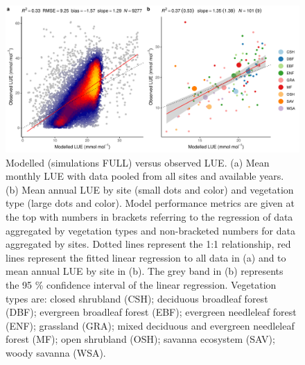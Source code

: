 \documentclass{myreport}
\begin{document}
 \begin{figure}[!ht]
\includegraphics[width=\textwidth]{fig/modobs_lue.pdf}
    \caption{Modelled (simulations FULL) versus observed LUE. (a) Mean monthly LUE with data pooled from all sites and available years. (b) Mean annual LUE by site (small dots and color) and vegetation type (large dots and color). Model performance metrics are given at the top with numbers in brackets referring to the regression of data aggregated by vegetation types and non-bracketed numbers for data aggregated by sites. Dotted lines represent the 1:1 relationship, red lines represent the fitted linear regression to all data in (a) and to mean annual LUE by site in (b). The grey band in (b) represents the 95 \% confidence interval of the linear regression. Vegetation types are: closed shrubland (CSH); deciduous broadleaf forest (DBF); evergreen broadleaf forest (EBF); evergreen needleleaf forest (ENF); grassland (GRA); mixed deciduous and evergreen needleleaf forest (MF); open shrubland (OSH); savanna ecosystem (SAV); woody savanna (WSA). }
    \label{fig:lue}
\end{figure}



\end{document}
